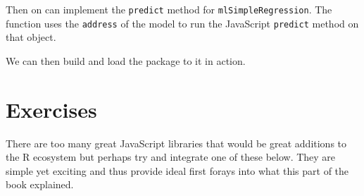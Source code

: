 \documentclass[
]{krantz}
\makeatletter
\newenvironment{Shaded}{\begin{snugshade}}{\end{snugshade}}
\newcommand{\CommentTok}[1]{\textcolor[rgb]{0.37,0.37,0.37}{\textit{#1}}}
\newcommand{\ControlFlowTok}[1]{\textcolor[rgb]{0.27,0.27,0.27}{\textbf{#1}}}
\newcommand{\DecValTok}[1]{\textcolor[rgb]{0.06,0.06,0.06}{#1}}
\newcommand{\KeywordTok}[1]{\textcolor[rgb]{0.27,0.27,0.27}{\textbf{#1}}}
\newcommand{\NormalTok}[1]{#1}
\newcommand{\OperatorTok}[1]{\textcolor[rgb]{0.43,0.43,0.43}{\textbf{#1}}}
\newcommand{\StringTok}[1]{\textcolor[rgb]{0.5,0.5,0.5}{#1}}
\newenvironment{kframe}{%
\medskip{}
\setlength{\fboxsep}{.8em}
 \def\at@end@of@kframe{}%
 \ifinner\ifhmode%
  \def\at@end@of@kframe{\end{minipage}}%
  \begin{minipage}{\columnwidth}%
 \fi\fi%
 \def\FrameCommand##1{\hskip\@totalleftmargin \hskip-\fboxsep
 \colorbox{shadecolor}{##1}\hskip-\fboxsep
     \hskip-\linewidth \hskip-\@totalleftmargin \hskip\columnwidth}%
 \MakeFramed {\advance\hsize-\width
   \@totalleftmargin\z@ \linewidth\hsize
   \@setminipage}}%
 {\par\unskip\endMakeFramed%
 \at@end@of@kframe}
\renewenvironment{Shaded}{\begin{kframe}}{\end{kframe}}
\makeatother
\begin{document}
Then on can implement the \texttt{predict} method for \texttt{mlSimpleRegression}. The function uses the \texttt{address} of the model to run the JavaScript \texttt{predict} method on that object.

\begin{Shaded}
\end{Shaded}

We can then build and load the package to it in action.

\begin{Shaded}
\end{Shaded}

\hypertarget{v8-ml-exercises}{%
\section{Exercises}\label{v8-ml-exercises}}

There are too many great JavaScript libraries that would be great additions to the R ecosystem but perhaps try and integrate one of these below. They are simple yet exciting and thus provide ideal first forays into what this part of the book explained.
\end{document}
